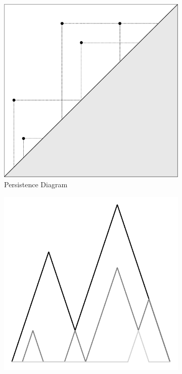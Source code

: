 \begin{figure}[t]
    \centering
    \begin{subfigure}[b]{0.23\textwidth}
        \includegraphics[width=\textwidth]{figs/ph/examples/pd_example.pdf}
        \caption{Persistence Diagram}
    \end{subfigure}\hfill
    \begin{subfigure}[b]{0.23\textwidth}
        \includegraphics[width=\textwidth]{figs/ph/examples/landscape_example.pdf}

\end{subfigure}
\end{figure}
